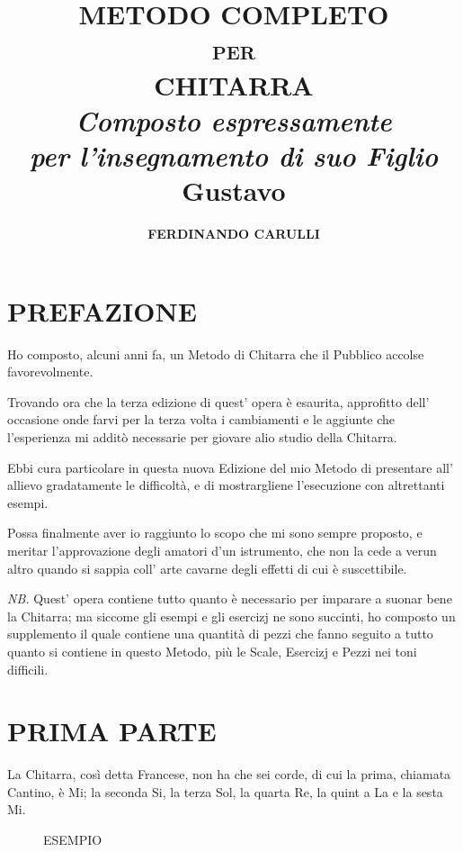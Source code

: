 \documentclass[a4paper]{book}
\title{%
  \Huge\textbf{METODO COMPLETO}\\[-1ex]
  \textsc{\large per}\\[-.5ex]
  \textbf{CHITARRA}\\[.5ex]
  \textit{\Large Composto espressamente\\
    per l'insegnamento di suo Figlio\\[.5ex]}
  \huge\textbf{Gustavo}}
\author{\Huge\bfseries FERDINANDO CARULLI}
\date{}
\begin{document}
\frontmatter

\maketitle
\thispagestyle{empty}

\part*{PREFAZIONE}

Ho composto, alcuni anni fa, un Metodo di Chitarra che il Pubblico accolse favorevolmente.

Trovando ora che la terza edizione di quest' opera è esaurita, approfitto dell' occasione onde farvi per la terza volta i cambiamenti e le aggiunte che l'esperienza mi additò necessarie per giovare alio studio della Chitarra.

Ebbi cura particolare in questa nuova Edizione del mio Metodo di presentare all' allievo gradatamente le difficoltà, e di mostrargliene l'esecuzione con altrettanti esempi.

Possa finalmente aver io raggiunto lo scopo che mi sono sempre proposto, e meritar l'approvazione degli amatori d'un istrumento, che non la cede a verun altro quando si sappia coll' arte cavarne degli effetti di cui è suscettibile.

\textit{NB\@.}  Quest' opera contiene tutto quanto è necessario per imparare a suonar bene la Chitarra; ma siccome gli esempi e gli esercizj ne sono succinti, ho composto un supplemento il quale contiene una quantità di pezzi che fanno seguito a tutto quanto si contiene in questo Metodo, più le Scale, Esercizj e Pezzi nei toni difficili.
\clearpage
\thispagestyle{empty}

\mainmatter

\renewcommand{\contentsname}{\Large\centering QUESTO METODO È DIVISO
  COME SEGUE.}
\tableofcontents
\thispagestyle{empty}
\clearpage
\thispagestyle{empty}

\part{PRIMA PARTE}

La Chitarra, così detta Francese, non ha che sei corde, di cui la prima, chiamata Cantino, è Mi; la seconda Si, la terza Sol, la quarta Re, la quint a La e la sesta Mi.

\begin{figure}[h]
  \centering
  \caption{ESEMPIO}
  \label{fig:strings}
\end{figure}
\end{document}

